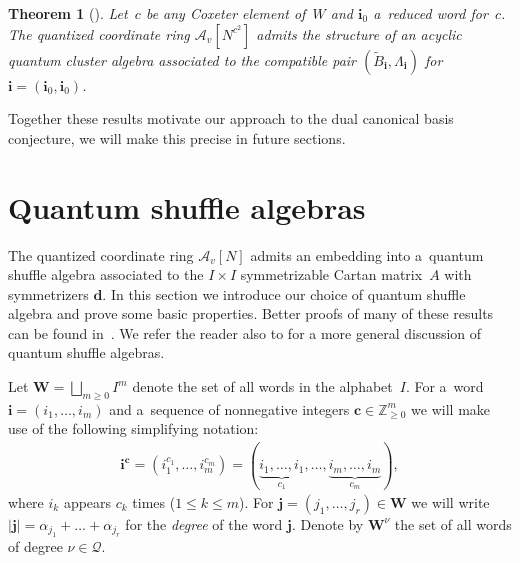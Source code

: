 \documentclass[pdftex]{sigma}
\numberwithin{equation}{section}
\newtheorem{Theorem}{Theorem}[section]
\begin{document}
\begin{Theorem}[\cite{berenstein-rupel}]
\label{th:quantum cluster structure}
Let~$c$ be any Coxeter element of~$W$ and $\mathbf{i}_0$ a~reduced word for~$c$.
The quantized coordinate ring $\mathcal{A}_v[N^{c^2}]$ admits the structure of an acyclic quantum cluster algebra
associated to the compatible pair $(\widetilde B_\mathbf{i},\Lambda_\mathbf{i})$ for
$\mathbf{i}=(\mathbf{i}_0,\mathbf{i}_0)$.
\end{Theorem}

Together these results motivate our approach to the dual canonical basis conjecture, we will make this precise in future
sections.

\section{Quantum shuf\/f\/le algebras}\label{sec:shuffle}

The quantized coordinate ring $\mathcal{A}_v[N]$ admits an embedding into a~quantum shuf\/f\/le algebra associated to the
$I\times I$ symmetrizable Cartan matrix~$A$ with symmetrizers $\mathbf{d}$.
In this section we introduce our choice of quantum shuf\/f\/le algebra and prove some basic properties.
Better proofs of many of these results can be found in~\cite{leclerc}.
We refer the reader also to \cite{Rosso} for a more general discussion of quantum shuf\/f\/le algebras.


Let $\mathbf{W}=\bigsqcup\limits_{m\ge0} I^m$ denote the set of all words in the alphabet~$I$.
For a~word $\mathbf{i}=(i_1,\ldots,i_m)$ and a~sequence of nonnegative integers $\mathbf{c}\in\mathbb{Z}_{\ge0}^m$ we
will make use of the following simplifying notation:
\begin{gather*}
\mathbf{i}^\mathbf{c}=(i_1^{c_1},\ldots,i_m^{c_m})=(\underbrace{i_1,\ldots,
i_1}_{c_1},\ldots,\underbrace{i_m,\ldots,i_m}_{c_m}),
\end{gather*}
where $i_k$ appears $c_k$ times ($1\le k\le m$).
For $\mathbf{j}=(j_1,\ldots,j_r)\in\mathbf{W}$ we will write $|\mathbf{j}|=\alpha_{j_1}+\dots+\alpha_{j_r}$ for the
\emph{degree} of the word $\mathbf{j}$.
Denote by $\mathbf{W}^\nu$ the set of all words of degree $\nu\in\mathcal{Q}$.
\end{document}

